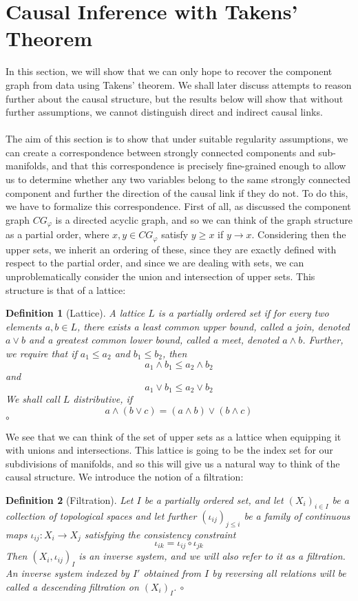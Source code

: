 \documentclass[11pt, a4paper]{memoir}
\theoremstyle{break}
\theoremstyle{break}
\newtheorem{innerdefn}{Definition}
\newenvironment{defn}
  {\begin{innerdefn}}
  {\ensuremath{\circ}\end{innerdefn}}
\theoremstyle{nonumberplain}
\begin{document}
\section{Causal Inference with Takens' Theorem}
In this section, we will show that we can only hope to recover the component graph from data using Takens' theorem. We shall later discuss attempts to reason further about the causal structure, but the results below will show that without further assumptions, we cannot distinguish direct and indirect causal links.\\\\
The aim of this section is to show that under suitable regularity assumptions, we can create a correspondence between strongly connected components and sub-manifolds, and that this correspondence is precisely fine-grained enough to allow us to determine whether any two variables belong to the same strongly connected component and further the direction of the causal link if they do not. To do this, we have to formalize this correspondence. First of all, as discussed the component graph $CG_\varphi$ is a directed acyclic graph, and so we can think of the graph structure as a partial order, where $x,y\in CG_\varphi$ satisfy $y\geqslant x$ if $y\to x$. Considering then the upper sets, we inherit an ordering of these, since they are exactly defined with respect to the partial order, and since we are dealing with sets, we can unproblematically consider the union and intersection of upper sets. This structure is that of a lattice: 
\begin{defn}[Lattice]
A \emph{lattice} $L$ is a partially ordered set if for every two elements $a,b\in L$, there exists a least common upper bound, called a \emph{join}, denoted $a \vee b$ and a greatest common lower bound, called a \emph{meet}, denoted $a\wedge b$. Further, we require that if $a_1\leqslant a_2$ and $b_1\leqslant b_2$, then
$$a_1\wedge b_1\leqslant a_2\wedge b_2$$
and
$$a_1\vee b_1\leqslant a_2\vee b_2$$
We shall call $L$ \emph{distributive}, if
$$a\wedge(b\vee c)=(a\wedge b)\vee (b\wedge c)$$
\end{defn}
We see that we can think of the set of upper sets as a lattice when equipping it with unions and intersections. This lattice is going to be the index set for our subdivisions of manifolds, and so this will give us a natural way to think of the causal structure. We introduce the notion of a filtration:
\begin{defn}[Filtration]
Let $I$ be a partially ordered set, and let $(X_i)_{i\in I}$ be a collection of topological spaces and let further $(\iota_{ij})_{j\leqslant i}$ be a family of continuous maps $\iota_{ij}: X_i\to X_j$ satisfying the consistency constraint
$$\iota_{ik}=\iota_{ij}\circ \iota_{jk}$$
Then $(X_i,\iota_{ij})_I$ is an \emph{inverse system}, and we will also refer to it as a \emph{filtration}. An inverse system indexed by $I'$ obtained from $I$ by reversing all relations will be called a \emph{descending filtration} on $(X_i)_I$.
\end{defn}
\end{document}
